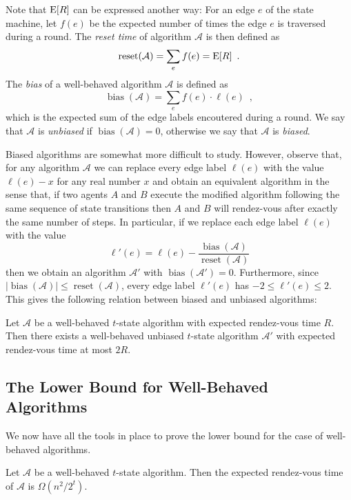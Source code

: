 \documentclass[acmtoalg]{acmtrans2m}
\newcommand{\A}{\mathcal{A}}
\DeclareMathOperator{\bias}{bias}
\DeclareMathOperator{\reset}{reset}
\begin{document}
Note that $\mathrm{E}[R]$ can be expressed another way: For an edge $e$ of the
state machine, let $f(e)$ be the expected number of times the edge $e$
is traversed during a round.  The
\emph{reset time} of algorithm $\A$ is then defined as
\[
   \reset(\A) = \sum_e f(e) = \E[R] \enspace .
\]
The \emph{bias} of a well-behaved algorithm $\A$ is defined as
\[
    \bias(\A) = \sum_{e} f(e)\cdot\ell(e) \enspace ,
\]
which is the expected sum of the edge labels encoutered during a round.
We say that $\A$ is \emph{unbiased} if $\bias(\A)=0$, otherwise we say
that $\A$ is \emph{biased}.

Biased algorithms are somewhat more difficult to study.  However,
observe that, for any algorithm $\mathcal{A}$ we can replace every
edge label $\ell(e)$ with the value $\ell(e)-x$ for any real number
$x$ and obtain an equivalent algorithm in the sense that, if two
agents $A$ and $B$ execute the modified algorithm following the same
sequence of state transitions then $A$ and $B$ will rendez-vous after
exactly the same number of steps.  In particular, if we replace each
edge label $\ell(e)$ with the value
\[
   \ell'(e) = \ell(e) - \frac{\bias(\A)}{\reset(\A)}
\]
then we obtain an algorithm $\A'$ with $\bias(\A')=0$.  Furthermore, since
$|\bias(\A)|\le\reset(\A)$, every edge label $\ell'(e)$ has
$-2 \le \ell'(e)\le 2$.  This gives the following relation between
biased and unbiased algorithms:

\begin{lem}
Let $\A$ be a well-behaved $t$-state algorithm with expected rendez-vous time
$R$.  Then there exists a well-behaved unbiased $t$-state algorithm $\A'$ with
expected rendez-vous time at most $2R$.
\end{lem}

\subsection{The Lower Bound for Well-Behaved Algorithms}

We now have all the tools in place to prove the lower bound for the
case of well-behaved algorithms.

\begin{lem}
Let $\A$ be a well-behaved $t$-state algorithm.  Then the expected rendez-vous
time of $\A$ is $\Omega(n^2/2^{t})$.
\end{lem}
\end{document}
